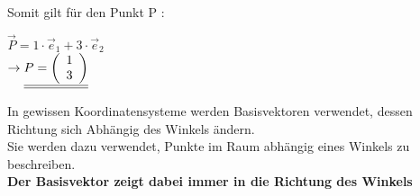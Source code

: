 Somit gilt für den Punkt P : \\
\begin{center}

	$\vec{P} = 1\cdot \vec{e}_1 + 3 \cdot \vec{e}_2$ \\
	$\rightarrow \underline{\underline{ P = \left ( \begin{array}{c} 1 \\ 3 \end{array}\right)}}$
\end{center}
\iend

\newpage


\beginip
In gewissen Koordinatensysteme werden Basisvektoren verwendet, dessen Richtung sich Abhängig  des Winkels ändern. \\
Sie werden dazu verwendet, Punkte im Raum abhängig eines Winkels zu beschreiben. \\
\textbf{Der Basisvektor zeigt dabei immer in die Richtung des Winkels}
\iend

